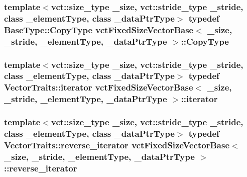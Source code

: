 \subsubsection[{Copy\+Type}]{\setlength{\rightskip}{0pt plus 5cm}template$<$vct\+::size\+\_\+type \+\_\+size, vct\+::stride\+\_\+type \+\_\+stride, class \+\_\+element\+Type, class \+\_\+data\+Ptr\+Type$>$ typedef {\bf Base\+Type\+::\+Copy\+Type} {\bf vct\+Fixed\+Size\+Vector\+Base}$<$ \+\_\+size, \+\_\+stride, \+\_\+element\+Type, \+\_\+data\+Ptr\+Type $>$\+::{\bf Copy\+Type}}\label{classvct_fixed_size_vector_base_a136da6f4bb90964f3f156533f85416d9}
\hypertarget{classvct_fixed_size_vector_base_a541b35f08260e286587f4aa516a83d82}{}
\subsubsection[{iterator}]{\setlength{\rightskip}{0pt plus 5cm}template$<$vct\+::size\+\_\+type \+\_\+size, vct\+::stride\+\_\+type \+\_\+stride, class \+\_\+element\+Type, class \+\_\+data\+Ptr\+Type$>$ typedef {\bf Vector\+Traits\+::iterator} {\bf vct\+Fixed\+Size\+Vector\+Base}$<$ \+\_\+size, \+\_\+stride, \+\_\+element\+Type, \+\_\+data\+Ptr\+Type $>$\+::{\bf iterator}}\label{classvct_fixed_size_vector_base_a541b35f08260e286587f4aa516a83d82}
\hypertarget{classvct_fixed_size_vector_base_af7dffb6aaecd3c33141026726e3a4852}{}
\subsubsection[{reverse\+\_\+iterator}]{\setlength{\rightskip}{0pt plus 5cm}template$<$vct\+::size\+\_\+type \+\_\+size, vct\+::stride\+\_\+type \+\_\+stride, class \+\_\+element\+Type, class \+\_\+data\+Ptr\+Type$>$ typedef {\bf Vector\+Traits\+::reverse\+\_\+iterator} {\bf vct\+Fixed\+Size\+Vector\+Base}$<$ \+\_\+size, \+\_\+stride, \+\_\+element\+Type, \+\_\+data\+Ptr\+Type $>$\+::{\bf reverse\+\_\+iterator}}\label{classvct_fixed_size_vector_base_af7dffb6aaecd3c33141026726e3a4852}
\hypertarget{classvct_fixed_size_vector_base_a8f1918b51b34a75973890b1b898b1991}{}
